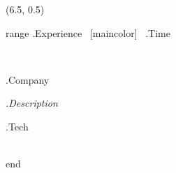 \begin{textblock}{14.5}(6.5, 0.5)

{{range .Experience}}
    {} ~\xrfill[0.0ex]{0.5pt}[maincolor]~ {{.Time}}

    \begin{minipage}{5mm}
    ~
    \end{minipage}
    \begin{minipage}{142mm}
        {{.Company}}

        \smallskip

       {\itshape {{.Description}}}

        \smallskip

        {{.Tech}}
    \end{minipage} \\[2ex]
{{end}}


\end{textblock}
